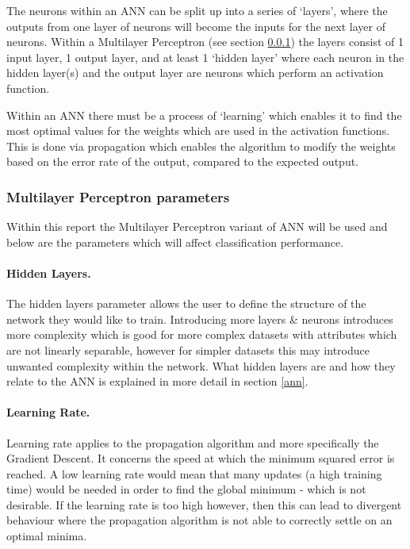 \documentclass[12pt]{article}
\begin{document}
    The neurons within an ANN can be split up into a series of ‘layers’, where the outputs from one layer of neurons will become the inputs for the next layer of neurons. Within a Multilayer Perceptron (see section \ref{mlp}) the layers consist of 1 input layer, 1 output layer, and at least 1 ‘hidden layer’ where each neuron in the hidden layer(s) and the output layer are neurons which perform an activation function.

    Within an ANN there must be a process of ‘learning’ which enables it to find the most optimal values for the weights which are used in the activation functions. This is done via propagation which enables the algorithm to modify the weights based on the error rate of the output, compared to the expected output.

    \subsubsection{Multilayer Perceptron parameters} \label{mlp}
    Within this report the Multilayer Perceptron \citep{minsky2017perceptrons} variant of ANN will be used and below are the parameters which will affect classification performance.

      \paragraph{Hidden Layers.}
        The hidden layers parameter allows the user to define the structure of the network they would like to train. Introducing more layers \& neurons introduces more complexity which is good for more complex datasets with attributes which are not linearly separable, however for simpler datasets this may introduce unwanted complexity within the network. What hidden layers are and how they relate to the ANN is explained in more detail in section \ref{ann}.

      \paragraph{Learning Rate.}
        Learning rate applies to the propagation algorithm and more specifically the Gradient Descent. It concerns the speed at which the minimum squared error is reached. A low learning rate would mean that many updates (a high training time) would be needed in order to find the global minimum - which is not desirable. If the learning rate is too high however, then this can lead to divergent behaviour where the propagation algorithm is not able to correctly settle on an optimal minima.
\end{document}

